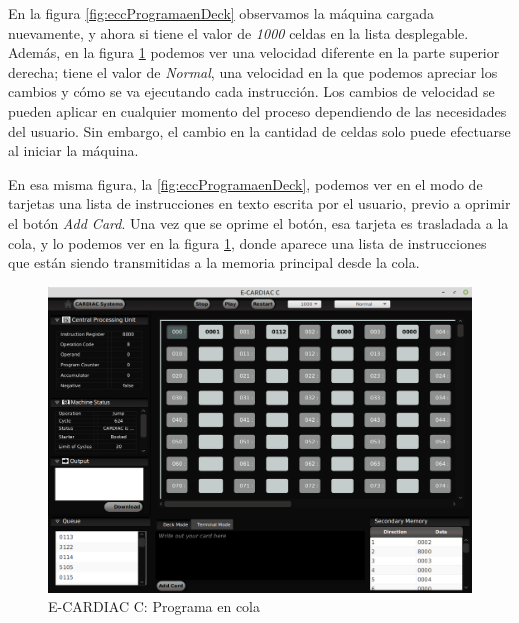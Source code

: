 \documentclass[letterpaper,12pt,oneside]{book}
\begin{document}
            
   
            En
			la figura \ref{fig:eccProgramaenDeck} observamos la máquina cargada nuevamente, y ahora si tiene el valor de \textit{1000} celdas en la 
			lista 
			desplegable. Además,
			en la figura \ref{fig:eccProgramaEnCola} podemos ver una velocidad diferente
            en la parte superior derecha;
			tiene el valor de \textit{Normal}, una velocidad en la que podemos apreciar los cambios y cómo se va ejecutando cada instrucción. Los 
			cambios de velocidad se pueden aplicar en cualquier momento del proceso dependiendo de las necesidades del usuario. Sin embargo, el cambio 
			en la 
			cantidad 
			de celdas solo puede efectuarse al iniciar la máquina.
			
			En esa misma figura, la \ref{fig:eccProgramaenDeck}, podemos ver en el modo de tarjetas una lista de instrucciones en texto
			escrita por el usuario,
			previo a oprimir el botón \textit{Add Card}. Una vez que se oprime el botón, esa tarjeta es trasladada a la
			cola, y lo podemos ver en la figura \ref{fig:eccProgramaEnCola}, donde aparece una lista de instrucciones que están siendo transmitidas a la 
			memoria principal desde la cola.

		\begin{figure}[h]		
			\centering
			\includegraphics[scale=0.54]{media/CARDIACC/eccProgramaenCola.png}
			\caption{E-CARDIAC C: Programa en cola}
			\label{fig:eccProgramaEnCola}
		\end{figure}	
		
\end{document}
